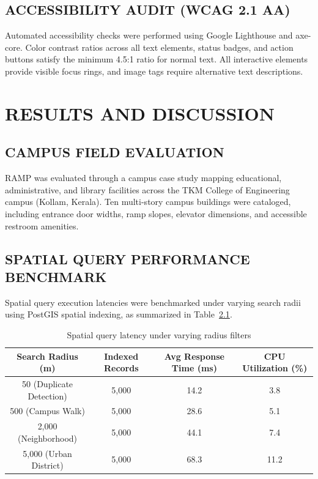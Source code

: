 \documentclass[12pt,a4paper]{report}
\begin{document}
\section{ACCESSIBILITY AUDIT (WCAG 2.1 AA)}
Automated accessibility checks were performed using Google Lighthouse and axe-core. Color contrast ratios across all text elements, status badges, and action buttons satisfy the minimum 4.5:1 ratio for normal text. All interactive elements provide visible focus rings, and image tags require alternative text descriptions.

\newpage
\chapter{RESULTS AND DISCUSSION}

\section{CAMPUS FIELD EVALUATION}
RAMP was evaluated through a campus case study mapping educational, administrative, and library facilities across the TKM College of Engineering campus (Kollam, Kerala). Ten multi-story campus buildings were cataloged, including entrance door widths, ramp slopes, elevator dimensions, and accessible restroom amenities.

\section{SPATIAL QUERY PERFORMANCE BENCHMARK}
Spatial query execution latencies were benchmarked under varying search radii using PostGIS spatial indexing, as summarized in Table~\ref{tab:query_latency}.

\begin{table}[htbp]
\centering
\caption{Spatial query latency under varying radius filters}
\label{tab:query_latency}
\begin{tabular}{cccc}
\toprule
\textbf{Search Radius (m)} & \textbf{Indexed Records} & \textbf{Avg Response Time (ms)} & \textbf{CPU Utilization (\%)} \\
\midrule
50 (Duplicate Detection) & 5,000 & 14.2 & 3.8 \\
500 (Campus Walk) & 5,000 & 28.6 & 5.1 \\
2,000 (Neighborhood) & 5,000 & 44.1 & 7.4 \\
5,000 (Urban District) & 5,000 & 68.3 & 11.2 \\
\bottomrule
\end{tabular}
\end{table}
\end{document}
